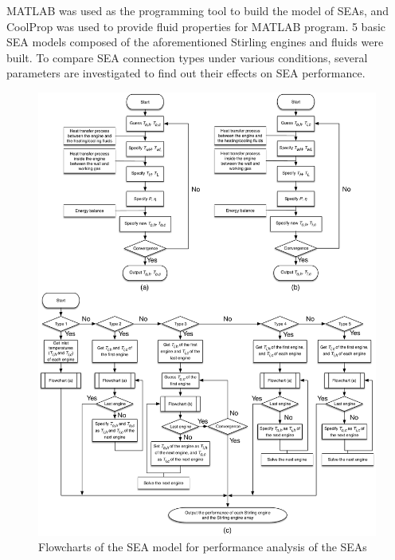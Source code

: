 


MATLAB was used as the programming tool to build the model of SEAs, and CoolProp was used to provide fluid properties for MATLAB program. 5 basic SEA models composed of the aforementioned Stirling engines and fluids were built. To compare SEA connection types under various conditions, several parameters are investigated to find out their effects on SEA performance.

\noindent \begin{figure}[htbp]
\begin{center}
	\includegraphics[width = 0.9\columnwidth]{./fig/FlowChart}
	\caption{Flowcharts of the SEA model for performance analysis of the SEAs}
	\label{fig:Flowchart}
\end{center}
\end{figure}

